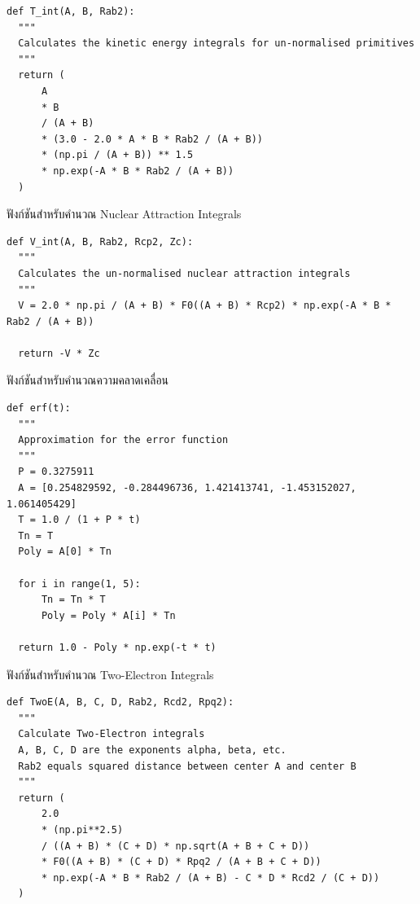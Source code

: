 \vspace{5pt}

\begin{lstlisting}[style=MyPython]
def T_int(A, B, Rab2):
  """
  Calculates the kinetic energy integrals for un-normalised primitives
  """
  return (
      A
      * B
      / (A + B)
      * (3.0 - 2.0 * A * B * Rab2 / (A + B))
      * (np.pi / (A + B)) ** 1.5
      * np.exp(-A * B * Rab2 / (A + B))
  )
\end{lstlisting}

\vspace{5pt}

\noindent ฟังก์ชันสำหรับคำนวณ Nuclear Attraction Integrals

\vspace{5pt}

\begin{lstlisting}[style=MyPython]
def V_int(A, B, Rab2, Rcp2, Zc):
  """
  Calculates the un-normalised nuclear attraction integrals
  """
  V = 2.0 * np.pi / (A + B) * F0((A + B) * Rcp2) * np.exp(-A * B * Rab2 / (A + B))

  return -V * Zc
\end{lstlisting}

\vspace{5pt}

\noindent ฟังก์ชันสำหรับคำนวณความคลาดเคลื่อน

\vspace{5pt}

\begin{lstlisting}[style=MyPython]
def erf(t):
  """
  Approximation for the error function
  """
  P = 0.3275911
  A = [0.254829592, -0.284496736, 1.421413741, -1.453152027, 1.061405429]
  T = 1.0 / (1 + P * t)
  Tn = T
  Poly = A[0] * Tn

  for i in range(1, 5):
      Tn = Tn * T
      Poly = Poly * A[i] * Tn

  return 1.0 - Poly * np.exp(-t * t)
\end{lstlisting}

\vspace{5pt}

\noindent ฟังก์ชันสำหรับคำนวณ Two-Electron Integrals
\vspace{5pt}

\begin{lstlisting}[style=MyPython]
def TwoE(A, B, C, D, Rab2, Rcd2, Rpq2):
  """
  Calculate Two-Electron integrals
  A, B, C, D are the exponents alpha, beta, etc.
  Rab2 equals squared distance between center A and center B
  """
  return (
      2.0
      * (np.pi**2.5)
      / ((A + B) * (C + D) * np.sqrt(A + B + C + D))
      * F0((A + B) * (C + D) * Rpq2 / (A + B + C + D))
      * np.exp(-A * B * Rab2 / (A + B) - C * D * Rcd2 / (C + D))
  )
\end{lstlisting}

